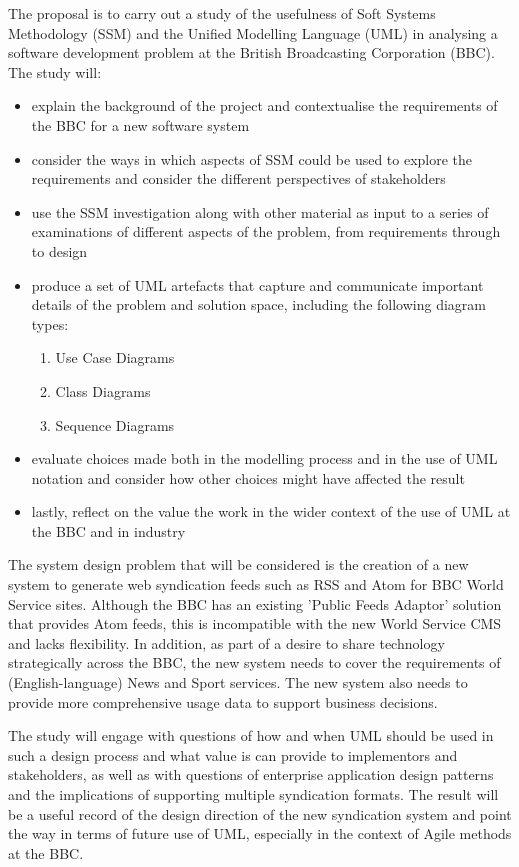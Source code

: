 \documentclass{article}
\begin{document}
The proposal is to carry out a study of the usefulness of Soft Systems Methodology (SSM) and the Unified Modelling Language (UML) in analysing a software development problem at the British Broadcasting Corporation (BBC). The study will:

\begin{itemize}
\item explain the background of the project and contextualise the requirements of the BBC for a new software system
\item consider the ways in which aspects of SSM could be used to explore the requirements and consider the different perspectives of stakeholders
\item use the SSM investigation along with other material as input to a series of examinations of different aspects of the problem, from requirements through to design
\item produce a set of UML artefacts that capture and communicate important details of the problem and solution space, including the following diagram types:
\begin{enumerate}
\item Use Case Diagrams
\item Class Diagrams
\item Sequence Diagrams
\end{enumerate}
\item evaluate choices made both in the modelling process and in the use of UML notation and consider how other choices might have affected the result
\item lastly, reflect on the value the work in the wider context of the use of UML at the BBC and in industry
\end{itemize}

The system design problem that will be considered is the creation of a new system to generate web syndication feeds such as RSS and Atom for BBC World Service sites. Although the BBC has an existing 'Public Feeds Adaptor' solution that provides Atom feeds, this is incompatible with the new World Service CMS and lacks flexibility. In addition, as part of a desire to share technology strategically across the BBC, the new system needs to cover the requirements of (English-language) News and Sport services. The new system also needs to provide more comprehensive usage data to support business decisions.

The study will engage with questions of how and when UML should be used in such a design process and what value is can provide to implementors and stakeholders, as well as with questions of enterprise application design patterns and the implications of supporting multiple syndication formats. The result will be a useful record of the design direction of the new syndication system and point the way in terms of future use of UML, especially in the context of Agile methods at the BBC.
\end{document}
